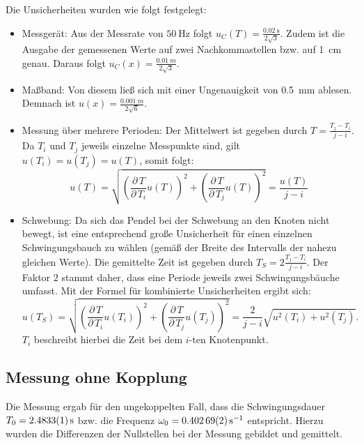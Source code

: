 \documentclass[11pt,a4paper,titlepage, ngerman]{article}
\begin{document}
			Die Unsicherheiten wurden wie folgt festgelegt:
			\begin{itemize}
				\item Messgerät: Aus der Messrate von $\SI{50}{\hertz}$ folgt $u_C(T) = \frac{\SI{0,02}{\second}}{2\sqrt{3}}$.
				Zudem ist die Ausgabe der gemessenen Werte auf zwei Nachkommastellen bzw. auf \SI{1}{\cm} genau. Daraus folgt $u_C(x) = \frac{\SI{0,01}{m}}{2\sqrt{3}}$.
				\item Maßband: Von diesem ließ sich mit einer Ungenauigkeit von \SI{0,5}{mm} ablesen. Demnach ist $u(x) = \frac{\SI{0,001}{m}}{2\sqrt{6}}$.
				\item Messung über mehrere Perioden: Der Mittelwert ist gegeben durch $T = \frac{T_j - T_i}{j-i}$.
				Da $T_i$ und $T_j$ jeweils einzelne Messpunkte sind, gilt $u(T_i) = u(T_j) = u(T)$, somit folgt:
				\begin{equation}
					u(T) = \sqrt{\left( \frac{\partial\, T}{\partial\, T_i} u(T)\right)^2 + \left( \frac{\partial\, T}{\partial\, T_j} u(T)\right)^2}
					=\frac{u(T)}{j-i}
				\end{equation}
				\item Schwebung: Da sich das Pendel bei der Schwebung an den Knoten nicht bewegt, ist eine entsprechend große Unsicherheit für einen einzelnen Schwingungsbauch zu wählen (gemäß der Breite des Intervalls der nahezu gleichen Werte).
				Die gemittelte Zeit ist gegeben durch $T_S = 2\frac{T_j - T_i}{j-i}$. Der Faktor $2$ stammt daher, dass eine Periode jeweils zwei Schwingungsbäuche umfasst.
				Mit der Formel für kombinierte Unsicherheiten ergibt sich:
				\begin{equation}
					u(T_S) = \sqrt{\left( \frac{\partial\, T}{\partial\, T_i} u(T_i)\right)^2 + \left( \frac{\partial\, T}{\partial\, T_j} u(T_j)\right)^2}
					=\frac{2}{j-i} \sqrt{u^2(T_i) + u^2(T_j)}.
				\end{equation}
				$T_i$ beschreibt hierbei die Zeit bei dem $i$-ten Knotenpunkt.
			\end{itemize}
			
		\subsection{Messung ohne Kopplung}
										
			Die Messung ergab für den ungekoppelten Fall, dass die Schwingungsdauer $T_0 = \SI{2,4833 +- 0,0001}{\second}$ bzw. die Frequenz $\omega_0 = \SI{0,40269 +- 0,00002}{\s^{-1}}$ entspricht. Hierzu wurden die Differenzen der Nullstellen bei der Messung gebildet und gemittelt. 
			
\end{document}
